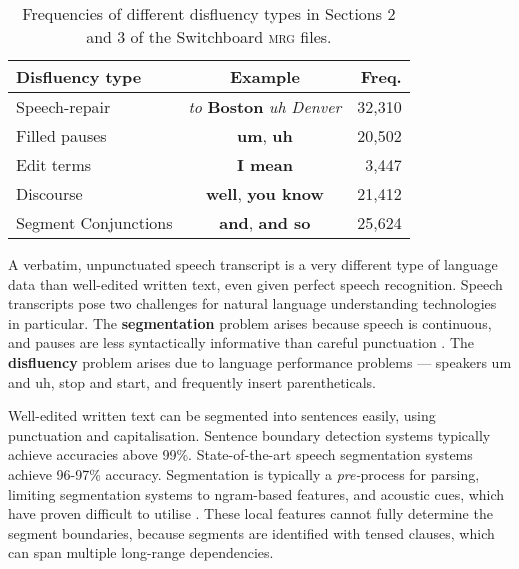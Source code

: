 \documentclass[11pt,letterpaper]{article}
\begin{document}
\begin{table}
    \centering
    \small
    \begin{tabular}{lc|r}
\hline
Disfluency type & Example & Freq. \\
\hline \hline
Speech-repair & \emph{to } \textbf{Boston} \emph{uh Denver} & 32,310 \\
Filled pauses    & \textbf{um}, \textbf{uh} & 20,502 \\
Edit terms & \textbf{I mean} & 3,447 \\ 
Discourse  & \textbf{well}, \textbf{you know} & 21,412  \\
Segment Conjunctions & \textbf{and}, \textbf{and so} & 25,624 \\
\hline
\end{tabular}
\caption{\small Frequencies of different disfluency types in Sections 2 and 3 of the
Switchboard \textsc{mrg} files.\label{tab:dfl_freqs}}
\vspace*{-0.5in}
\end{table}


A verbatim, unpunctuated speech transcript is
a very different type of language data than well-edited written text, even
given perfect speech recognition.  Speech transcripts pose
two challenges for natural language understanding technologies in particular.
The \textbf{segmentation} problem arises because speech is continuous, and 
pauses are less syntactically informative than careful punctuation \citep{gregory:04}.
The \textbf{disfluency} problem arises due to language performance problems ---
speakers um and uh, stop and start, and frequently insert parentheticals.


Well-edited written text can be segmented into sentences easily, using punctuation and
capitalisation.  Sentence boundary detection systems typically achieve accuracies
above 99\%.  State-of-the-art speech segmentation systems achieve 96-97\% accuracy.
Segmentation is typically a \emph{pre-}process for parsing, limiting segmentation
systems to ngram-based features, and acoustic cues, which have proven difficult
to utilise \citep{liu:05}.  These local features cannot fully determine the segment
boundaries, because
segments are identified with tensed clauses, which can span multiple long-range dependencies.  
\end{document}
